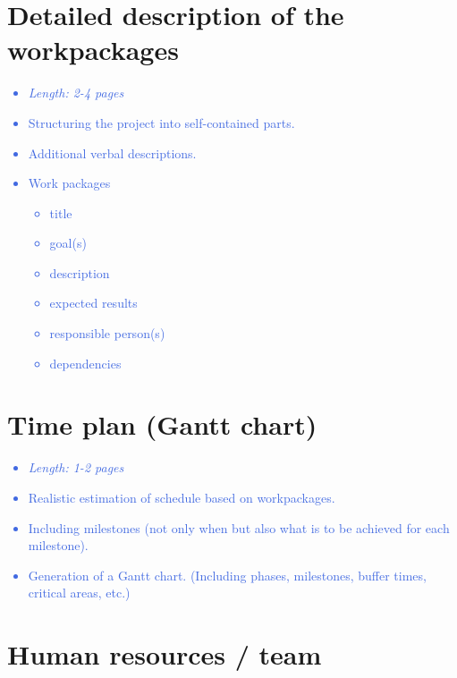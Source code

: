 \documentclass[a4paper,11pt]{article}
\providecommand*{\note}[1]{\small \textcolor{RoyalBlue}{\begin{minipage}{\textwidth}{#1}\end{minipage}}}
\begin{document}
\section{Detailed description of the workpackages}
\label{sect:workplan}

\note{
\begin{itemize}
\item {\em Length: 2-4 pages}
\item Structuring the project into self-contained parts.
\item Additional verbal descriptions.
\item Work packages
    \begin{itemize}
    \item title
    \item goal(s)
    \item description
    \item expected results
    \item responsible person(s)
    \item dependencies
    \end{itemize}
\end{itemize}
}

\section{Time plan (Gantt chart)}
\label{sect:timeplan}

\note{
\begin{itemize}
\item {\em Length: 1-2 pages}
\item Realistic estimation of schedule based on workpackages.
\item Including milestones (not only when but also what is to be achieved for each milestone).
\item Generation of a Gantt chart. (Including phases, milestones, buffer times, critical areas, etc.)
\end{itemize}
}

\section{Human resources / team}
\label{sect:team}
\end{document}
